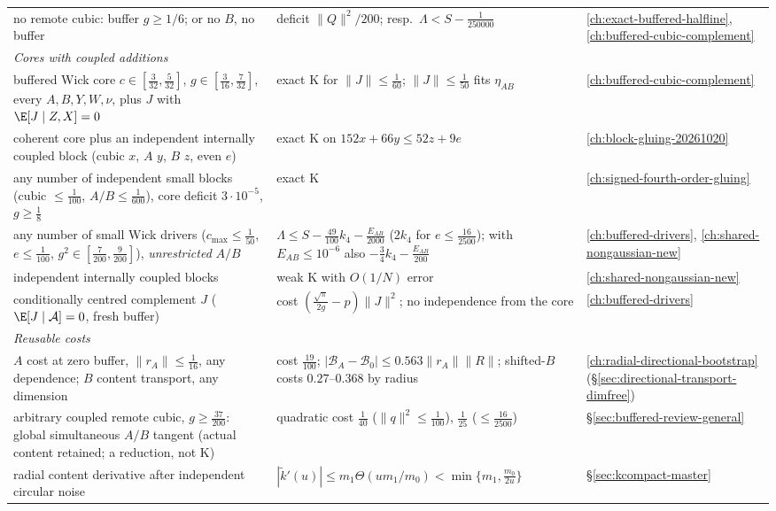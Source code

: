 \begin{center}
\begin{tabular}{p{6.4cm}p{5.2cm}p{2.4cm}}
no remote cubic: buffer $g\ge1/6$; or no $B$, no buffer & deficit $\|Q\|^2/200$; resp.\ $\Lambda<S-\frac1{250000}$ & \autoref{ch:exact-buffered-halfline}, \autoref{ch:buffered-cubic-complement}\\
\multicolumn{3}{l}{\emph{Cores with coupled additions}}\\
buffered Wick core $c\in[\frac3{32},\frac5{32}]$, $g\in[\frac3{16},\frac7{32}]$, every $A,B,Y,W,\nu$, plus $J$ with $\E[J\mid Z,X]=0$ & exact K for $\|J\|\le\frac1{60}$; $\|J\|\le\frac1{50}$ fits $\eta_{AB}$ & \autoref{ch:buffered-cubic-complement}\\
coherent core plus an independent internally coupled block (cubic $x$, $A$ $y$, $B$ $z$, even $e$) & exact K on $152x+66y\le52z+9e$ & \autoref{ch:block-gluing-20261020}\\
any number of independent small blocks (cubic $\le\frac1{100}$, $A/B\le\frac1{600}$), core deficit $3\cdot10^{-5}$, $g\ge\frac18$ & exact K & \autoref{ch:signed-fourth-order-gluing}\\
any number of small Wick drivers ($c_{\max}\le\frac1{50}$, $e\le\frac1{100}$, $g^2\in[\frac7{200},\frac9{200}]$), \emph{unrestricted} $A/B$ & $\Lambda\le S-\frac{49}{100}k_4-\frac{E_{AB}}{2000}$ ($2k_4$ for $e\le\frac{16}{2500}$); with $E_{AB}\le10^{-6}$ also $-\frac34k_4-\frac{E_{AB}}{200}$ & \autoref{ch:buffered-drivers}, \autoref{ch:shared-nongaussian-new}\\
independent internally coupled blocks & weak K with $O(1/N)$ error & \autoref{ch:shared-nongaussian-new}\\
conditionally centred complement $J$ ($\E[J\mid\mathcal A]=0$, fresh buffer) & cost $(\frac{\sqrt\pi}{2g}-p)\|J\|^2$; no independence from the core & \autoref{ch:buffered-drivers}\\
\multicolumn{3}{l}{\emph{Reusable costs}}\\
$A$ cost at zero buffer, $\|r_A\|\le\frac1{16}$, any dependence; $B$ content transport, any dimension & cost $\frac{19}{100}$; $|\mathcal B_A-\mathcal B_0|\le0.563\|r_A\|\|R\|$; shifted-$B$ costs $0.27$--$0.368$ by radius & \autoref{ch:radial-directional-bootstrap} (\S\ref{sec:directional-transport-dimfree})\\
arbitrary coupled remote cubic, $g\ge\frac{37}{200}$: global simultaneous $A/B$ tangent (actual content retained; a reduction, not K) & quadratic cost $\frac1{40}$ ($\|q\|^2\le\frac1{100}$), $\frac1{25}$ ($\le\frac{16}{2500}$) & \S\ref{sec:buffered-review-general}\\
radial content derivative after independent circular noise & $|\tilde k'(u)|\le m_1\Theta(um_1/m_0)<\min\{m_1,\frac{m_0}{2u}\}$ & \S\ref{sec:kcompact-master}\\

\end{tabular}
\end{center}
